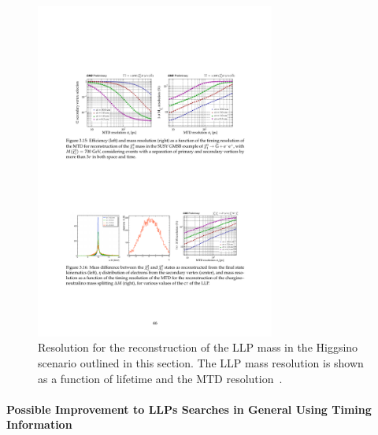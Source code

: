\begin{figure}[t]\begin{center}
\includegraphics[width=0.7\textwidth]{figures/cms-tdr-mip-fig3-16.pdf}
\caption{
Resolution for the reconstruction of the LLP mass in the Higgsino scenario outlined in this section. The LLP mass resolution is shown as a function of lifetime and the MTD resolution~\cite{MTD_TP}.
}
\label{fig:cmsupgrade_mtd}
\end{center}
\end{figure}



\paragraph{Possible Improvement to LLPs Searches in General Using Timing Information}

